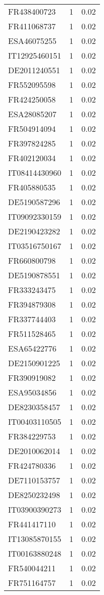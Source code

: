 \begin{table*}[htbp]
\begin{tabular}{lrr}
FR438400723 & 1 & 0.02 \\
FR411068737 & 1 & 0.02 \\
ESA46075255 & 1 & 0.02 \\
IT12925460151 & 1 & 0.02 \\
DE2011240551 & 1 & 0.02 \\
FR552095598 & 1 & 0.02 \\
FR424250058 & 1 & 0.02 \\
ESA28085207 & 1 & 0.02 \\
FR504914094 & 1 & 0.02 \\
FR397824285 & 1 & 0.02 \\
FR402120034 & 1 & 0.02 \\
IT08414430960 & 1 & 0.02 \\
FR405880535 & 1 & 0.02 \\
DE5190587296 & 1 & 0.02 \\
IT09092330159 & 1 & 0.02 \\
DE2190423282 & 1 & 0.02 \\
IT03516750167 & 1 & 0.02 \\
FR660800798 & 1 & 0.02 \\
DE5190878551 & 1 & 0.02 \\
FR333243475 & 1 & 0.02 \\
FR394879308 & 1 & 0.02 \\
FR337744403 & 1 & 0.02 \\
FR511528465 & 1 & 0.02 \\
ESA65422776 & 1 & 0.02 \\
DE2150901225 & 1 & 0.02 \\
FR390919082 & 1 & 0.02 \\
ESA95034856 & 1 & 0.02 \\
DE8230358457 & 1 & 0.02 \\
IT00403110505 & 1 & 0.02 \\
FR384229753 & 1 & 0.02 \\
DE2010062014 & 1 & 0.02 \\
FR424780336 & 1 & 0.02 \\
DE7110153757 & 1 & 0.02 \\
DE8250232498 & 1 & 0.02 \\
IT03900390273 & 1 & 0.02 \\
FR441417110 & 1 & 0.02 \\
IT13085870155 & 1 & 0.02 \\
IT00163880248 & 1 & 0.02 \\
FR540044211 & 1 & 0.02 \\
FR751164757 & 1 & 0.02 \\

\end{tabular}
\end{table*}
